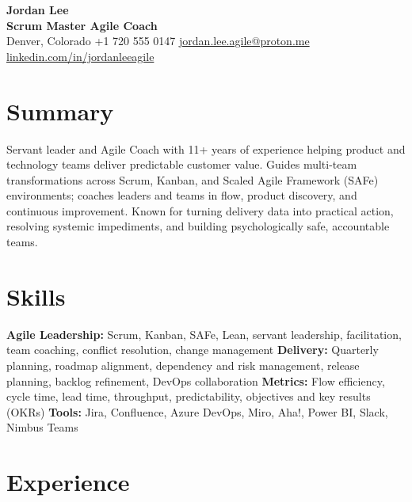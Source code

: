 \documentclass[10pt,letterpaper]{article}
\begin{document}
\begin{center}
  {\Huge\bfseries\color{accent} Jordan Lee}\\[2pt]
  {\large\bfseries Scrum Master \textbar{} Agile Coach}\\[3pt]
  Denver, Colorado \textbar{} +1 720 555 0147 \textbar{}
  \href{mailto:jordan.lee.agile@proton.me}{jordan.lee.agile@proton.me} \textbar{}
  \href{https://www.linkedin.com/in/jordanleeagile}{linkedin.com/in/jordanleeagile}
\end{center}

\vspace{-5pt}
\section*{Summary}
Servant leader and Agile Coach with 11+ years of experience helping product and technology teams deliver predictable customer value. Guides multi-team transformations across Scrum, Kanban, and Scaled Agile Framework (SAFe) environments; coaches leaders and teams in flow, product discovery, and continuous improvement. Known for turning delivery data into practical action, resolving systemic impediments, and building psychologically safe, accountable teams.

\section*{Skills}
\textbf{Agile Leadership:} Scrum, Kanban, SAFe, Lean, servant leadership, facilitation, team coaching, conflict resolution, change management \textbar{} \textbf{Delivery:} Quarterly planning, roadmap alignment, dependency and risk management, release planning, backlog refinement, DevOps collaboration \textbar{} \textbf{Metrics:} Flow efficiency, cycle time, lead time, throughput, predictability, objectives and key results (OKRs) \textbar{} \textbf{Tools:} Jira, Confluence, Azure DevOps, Miro, Aha!, Power BI, Slack, Nimbus Teams

\section*{Experience}
\end{document}
